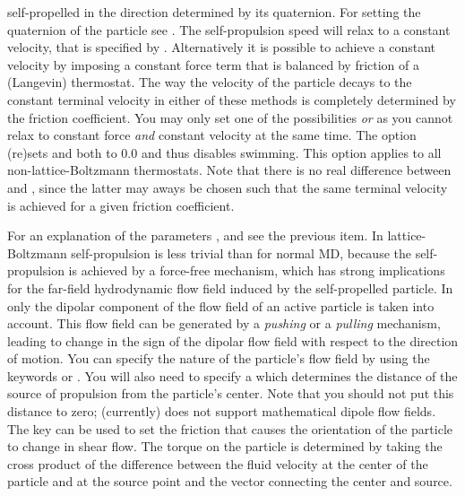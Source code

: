 \begin{arguments}
  self-propelled in the direction determined by its quaternion. For
  setting the quaternion of the particle see . The
  self-propulsion speed will relax to a constant velocity, that is
  specified by . Alternatively it is possible to
  achieve a constant velocity by imposing a constant force term
   that is balanced by friction of a (Langevin)
  thermostat. The way the velocity of the particle decays to the
  constant terminal velocity in either of these methods is completely
  determined by the friction coefficient. You may only set one of the
  possibilities  \emph{or}  as you
  cannot relax to constant force \emph{and} constant velocity at the
  same time. The option  (re)sets  and
   both to $0.0$ and thus disables swimming. This option
  applies to all non-lattice-Boltzmann thermostats. Note that there is
  no real difference between  and ,
  since the latter may aways be chosen such that the same terminal
  velocity is achieved for a given friction coefficient.
\item[{\parbox[t]{\linewidth}{\optlong{swimming \alt{%
          \alt{v_swim \var{v\_swim} \asep f_swim \var{f\_swim}}
          \alt{pusher \asep puller} dipole_length \var{dipole\_length}
          rotational_friction \var{rotational\_friction} \asep off}%
      }}}] For an explanation of the parameters ,
   and  see the previous item. In
  lattice-Boltzmann self-propulsion is less trivial than for normal
  MD, because the self-propulsion is achieved by a force-free
  mechanism, which has strong implications for the far-field
  hydrodynamic flow field induced by the self-propelled particle. In
  \es{} only the dipolar component of the flow field of an active
  particle is taken into account. This flow field can be generated by
  a \emph{pushing} or a \emph{pulling} mechanism, leading to change in
  the sign of the dipolar flow field with respect to the direction of
  motion. You can specify the nature of the particle's flow field by
  using the keywords  or . You will
  also need to specify a  which determines the
  distance of the source of propulsion from the particle's
  center. Note that you should not put this distance to zero; \es{}
  (currently) does not support mathematical dipole flow fields. The
  key  can be used to set the friction
  that causes the orientation of the particle to change in shear
  flow. The torque on the particle is determined by taking the cross
  product of the difference between the fluid velocity at the center
  of the particle and at the source point and the vector connecting
  the center and source.


\end{arguments}
